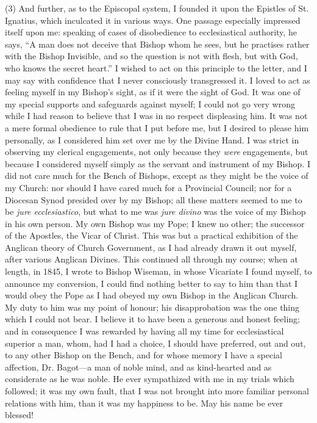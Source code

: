 (3) And further, as to the Episcopal system, I founded it upon
the Epistles of St. Ignatius, which inculcated it in various ways. One
passage especially impressed itself upon me: speaking of cases of
disobedience to ecclesiastical authority, he says, ``A man
does not deceive that Bishop whom he sees, but he practises rather with the Bishop Invisible, and so the question is not with flesh,
but with God, who knows the secret heart.'' I wished to act on this
principle to the letter, and I may say with confidence that I never
consciously transgressed it. I loved to act as feeling myself in my Bishop's
sight, as if it were the sight of God. It was one
of my special supports and safeguards against myself; I could not go very wrong while I had reason to believe that
I was in no respect displeasing him. It was not a mere formal obedience
to rule that I put before me, but I desired to please him personally, as
I considered him set over me by the Divine Hand. I was strict in
observing my clerical engagements, not only because they \emph{were}
engagements, but because I considered myself simply as the servant and
instrument of my Bishop. I did not care much for the Bench of Bishops,
except as they might be the voice of my Church: nor should I have cared
much for a Provincial Council; nor for a Diocesan Synod presided over by
my Bishop; all these matters seemed to me to be \emph{jure ecclesiastico},
but what to me was \emph{jure divino} was the voice of my Bishop in his
own person. My own Bishop was my Pope; I knew no other; the successor of
the Apostles, the Vicar of Christ. This was but a practical exhibition
of the Anglican theory of Church Government, as I had already drawn it
out myself, after various Anglican Divines. This continued all
through my course; when at length, in 1845, I wrote to Bishop Wiseman, in
whose Vicariate I found myself, to announce my conversion, I could find
nothing better to say to him than that I would obey the Pope as I had
obeyed my own Bishop in the Anglican Church. My duty to him was my point
of honour; his disapprobation was the one thing which I could not bear.
I believe it to have been a generous and honest feeling; and in
consequence I was rewarded by having all my time for ecclesiastical
superior a man, whom, had I had a choice, I should have preferred, out
and out, to any other Bishop on the Bench, and for whose memory I have a
special affection, Dr. Bagot—a man of noble mind, and as
kind-hearted and as considerate as he was noble. He ever sympathized
with me in my trials which followed; it was my own fault, that I was not
brought into more familiar personal relations with him, than it was my
happiness to be. May his name be ever blessed!


